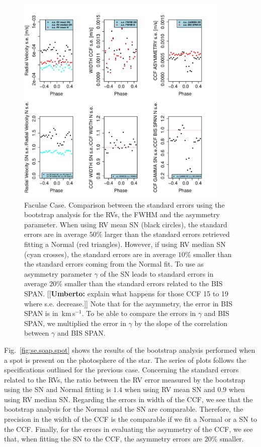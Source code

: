 \documentclass[11pt, oneside]{article}
\def\kms{\hbox{\,km\,s$^{-1}$}}       %
\newcommand{\umberto}[1]{{\color{green}[[\textbf{Umberto: }#1]]}}
\begin{document}
{\begin{figure}[htbp]
   \centering
\includegraphics[height = 4in]{RV_comparison_FACULAE_standard_errors.pdf} 
   \caption{Faculae Case. Comparison between the standard errors using the bootstrap analysis for the RVs, the FWHM and the asymmetry parameter. When using RV mean SN (black circles), the standard errors are in average $50\%$ larger than the standard errors retrieved fitting a Normal (red triangles). However, if using RV median SN (cyan crosses), the standard errors are in average $10\%$ smaller than the standard errors coming from the Normal fit. To use as asymmetry parameter $\gamma$ of the SN leads to standard errors in average $20\%$ smaller than the standard errors related to the BIS SPAN. \umberto{explain what happens for those CCF 15 to 19 where s.e. decrease.} Note that for the asymmetry, the error in BIS SPAN is in \kms. To be able to compare the errors in $\gamma$ and BIS SPAN, we multiplied the error in $\gamma$ by the slope of the correlation between $\gamma$ and BIS SPAN.}
   \label{fig:se.soap.faculae}
\end{figure}

Fig.~\ref{fig:se.soap.spot} shows the results of the bootstrap analysis performed when a spot is present on the photosphere of the star. The series of plots follows the specifications outlined for the previous case. Concerning the standard errors related to the RVs, the ratio between the RV error measured by the bootstrap using the SN and Normal fitting is $1.4$ when using RV mean SN and $0.9$ when using RV median SN. Regarding the errors in width of the CCF, we see that the bootstrap analysis for the Normal and the SN are comparable. Therefore, the precision in the width of the CCF is the comparable if we fit a Normal or a SN to the CCF. Finally, for the errors in evaluating the asymmetry of the CCF, we see that, when fitting the SN to the CCF, the asymmetry errors are $20\%$ smaller.

}
\end{document}
